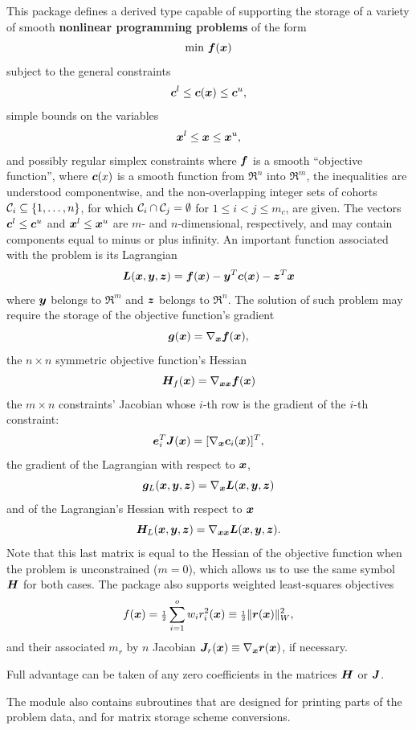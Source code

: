 \documentclass{galahad}
\begin{document}
\galheader


\galsummary
This package defines a derived type capable of supporting the storage of
a variety of smooth {\bf nonlinear programming problems} of the form
\[
\min \, {\bm{f}}({\bm{x}})
\]
subject to the general constraints
\[
{\bm{c}}^l \leq {\bm{c}}({\bm{x}}) \leq {\bm{c}}^u,
\]
simple bounds on the variables
\[
{\bm{x}}^l \leq {\bm{x}} \leq {\bm{x}}^u,
\]
and possibly regular simplex constraints
where ${\bm{f}}$ is a smooth ``objective function'', where ${\bm{c}}(x)$ is a smooth
function from $\Re^n$ into $\Re^m$, the inequalities are understood
componentwise, and the non-overlapping integer
sets of cohorts $\calC_i \subseteq \{1,\ldots,n\}$, for which
$\calC_i \cap \calC_j = \emptyset$ for $1 \leq i < j \leq m_c$, are given.
The vectors ${\bm{c}}^l \leq {\bm{c}}^u$ and ${\bm{x}}^l \leq {\bm{x}}^u$ are
$m$- and $n$-dimensional, respectively, and may contain components equal to
minus or plus infinity. An important function associated with the problem
is its Lagrangian
\[
{\bm{L}}( {\bm{x}},{\bm{y}}, {\bm{z}}) = {\bm{f}}({\bm{x}}) - {\bm{y}}^T{\bm{c}}({\bm{x}}) - {\bm{z}}^T{\bm{x}}
\]
where ${\bm{y}}$ belongs to $\Re^m$ and ${\bm{z}}$ belongs to $\Re^n$.
The solution of such problem may require the storage of the objective
function's gradient 
\[
{\bm{g}}({\bm{x}}) = \nabla_{{\bm{x}}} {\bm{f}}({\bm{x}}),
\]
the $n \times n$ symmetric objective function's Hessian
\[
{\bm{H}}_f({\bm{x}}) = \nabla_{{\bm{x}}{\bm{x}}} {\bm{f}}({\bm{x}})
\]
the $m \times n$ constraints' Jacobian whose $i$-th row is the 
gradient of the $i$-th constraint:
\[
{\bm{e}}_i^T {\bm{J}}({\bm{x}}) = [ \nabla_{{\bm{x}}} {\bm{c}}_i({\bm{x}}) ]^T,
\]
the gradient of the Lagrangian with respect to ${\bm{x}}$,
\[
{\bm{g}}_L({\bm{x}},{\bm{y}},{\bm{z}}) = \nabla_{{\bm{x}}} {\bm{L}}( {\bm{x}},{\bm{y}}, {\bm{z}})
\]
and of the Lagrangian's Hessian with respect to ${\bm{x}}$
\[
{\bm{H}}_L({\bm{x}},{\bm{y}},{\bm{z}}) = \nabla_{{\bm{x}}{\bm{x}}} {\bm{L}}( {\bm{x}},{\bm{y}}, {\bm{z}}).
\]
Note that this last matrix is equal to the Hessian of the objective function
when the problem is unconstrained ($m=0$), which allows us
to use the same symbol ${\bm{H}}$ for both cases. The package also supports
weighted least-squares objectives
\[f({\bm{x}}) = {\scriptstyle \frac{1}{2}} \sum_{i=1}^{o} w_i r^2_i({\bm{x}}) \equiv {\scriptstyle \frac{1}{2}} \|{\bm{r}}({\bm{x}})\|_W^2,
\]
and their associated $m_r$ by $n$ Jacobian 
${\bm{J}}_r({\bm{x}}) \equiv \nabla_{{\bm{x}}} {\bm{r}}({\bm{x}})$, if necessary.

\noindent
Full advantage can be taken of any zero coefficients in the matrices ${\bm{H}}$ 
or ${\bm{J}}$.

\noindent
The module also contains subroutines that are designed for printing parts 
of the problem data, and for matrix storage scheme conversions. 
\end{document}
